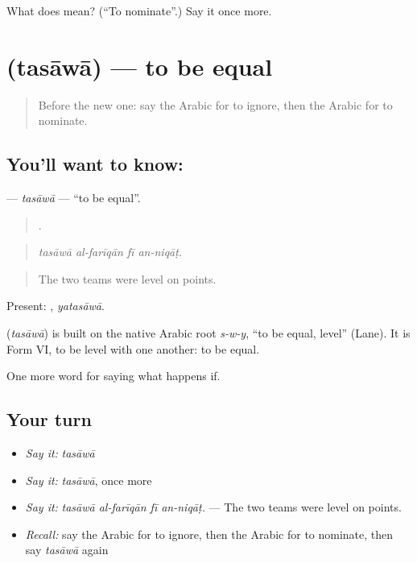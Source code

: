 \begin{tcolorbox}[breakable,colback=teal!4,colframe=teal!35!black,title={Before you move on}]
What does  mean? (\textquotedblleft{}To nominate\textquotedblright{}.) Say it once more.
\end{tcolorbox}
\section[\texorpdfstring{\ar{تساوى} (tasāwā)}{تساوى (tasāwā)}]{ (tasāwā) — to be equal}

\label{lesson:AR-C420-tasawa}



\begin{quote}
Before the new one: say the Arabic for to ignore, then the Arabic for to nominate.
\end{quote}

\subsection*{You'll want to know: }
\textbf{} — \emph{tasāwā} — \textquotedblleft{}to be equal\textquotedblright{}.

\begin{quote}
   .
\end{quote}

\begin{quote}
\emph{tasāwā al-farīqān fī an-niqāṭ.}
\end{quote}

\begin{quote}
The two teams were level on points.
\end{quote}

Present: , \emph{yatasāwā}.

\begin{cousinweb}
\textbf{} (\emph{tasāwā}) is built on the native Arabic root \emph{s-w-y}, \textquotedblleft{}to be equal, level\textquotedblright{} (Lane). It is Form VI, to be level with one another: to be equal.
\end{cousinweb}

\begin{grammarlens}[title={What you've built}]
One more word for saying what happens if.
\end{grammarlens}

\subsection*{Your turn}
\begin{itemize}
\raggedright
  \item \emph{Say it:} \emph{tasāwā}
  \item \emph{Say it:} \emph{tasāwā}, once more
  \item \emph{Say it:} \emph{tasāwā al-farīqān fī an-niqāṭ.} — The two teams were level on points.
  \item \emph{Recall:} say the Arabic for to ignore, then the Arabic for to nominate, then say \emph{tasāwā} again
\end{itemize}

